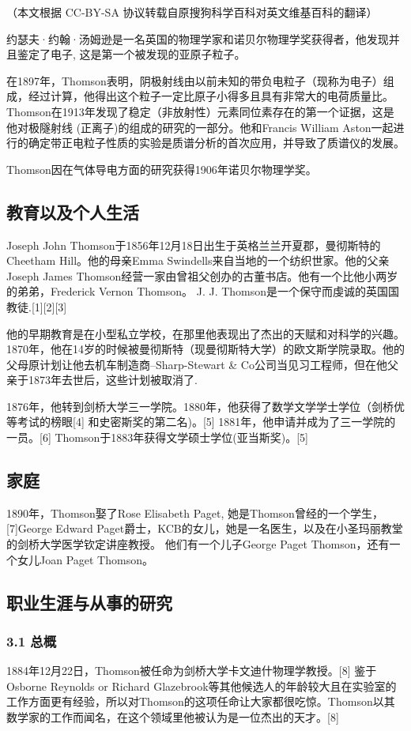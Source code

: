 
（本文根据 CC-BY-SA 协议转载自原搜狗科学百科对英文维基百科的翻译）

约瑟夫·约翰·汤姆逊是一名英国的物理学家和诺贝尔物理学奖获得者，他发现并且鉴定了电子, 这是第一个被发现的亚原子粒子。

在1897年，Thomson表明，阴极射线由以前未知的带负电粒子（现称为电子）组成，经过计算，他得出这个粒子一定比原子小得多且具有非常大的电荷质量比。 Thomson在1913年发现了稳定（非放射性）元素同位素存在的第一个证据，这是他对极隧射线 (正离子)的组成的研究的一部分。他和Francis William Aston一起进行的确定带正电粒子性质的实验是质谱分析的首次应用，并导致了质谱仪的发展。

Thomson因在气体导电方面的研究获得1906年诺贝尔物理学奖。

\subsection{教育以及个人生活}
Joseph John Thomson于1856年12月18日出生于英格兰兰开夏郡，曼彻斯特的Cheetham Hill。他的母亲Emma Swindells来自当地的一个纺织世家。他的父亲Joseph James Thomson经营一家由曾祖父创办的古董书店。他有一个比他小两岁的弟弟，Frederick Vernon Thomson。 J. J. Thomson是一个保守而虔诚的英国国教徒.[1][2][3]

他的早期教育是在小型私立学校，在那里他表现出了杰出的天赋和对科学的兴趣。1870年，他在14岁的时候被曼彻斯特（现曼彻斯特大学）的欧文斯学院录取。他的父母原计划让他去机车制造商--Sharp-Stewart & Co公司当见习工程师，但在他父亲于1873年去世后，这些计划被取消了.

1876年，他转到剑桥大学三一学院。1880年，他获得了数学文学学士学位（剑桥优等考试的榜眼[4] 和史密斯奖的第二名)。[5] 1881年，他申请并成为了三一学院的一员。[6] Thomson于1883年获得文学硕士学位(亚当斯奖)。[5]

\subsection{家庭}
1890年，Thomson娶了Rose Elisabeth Paget, 她是Thomson曾经的一个学生，[7]George Edward Paget爵士，KCB的女儿，她是一名医生，以及在小圣玛丽教堂的剑桥大学医学钦定讲座教授。 他们有一个儿子George Paget Thomson，还有一个女儿Joan Paget Thomson。

\subsection{职业生涯与从事的研究}
\subsubsection{3.1 总概}
1884年12月22日，Thomson被任命为剑桥大学卡文迪什物理学教授。[8] 鉴于Osborne Reynolds or Richard Glazebrook等其他候选人的年龄较大且在实验室的工作方面更有经验，所以对Thomson的这项任命让大家都很吃惊。Thomson以其数学家的工作而闻名，在这个领域里他被认为是一位杰出的天才。[8]

